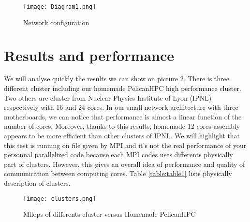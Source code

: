 \documentclass[11pt,a4paper]{article}
\begin{document}
\begin{figure}[!htb]
\centering
\texttt{[image: Diagram1.png]}
\caption{Network configuration}
\label{fig:Figure2}
\end{figure}

\section{Results and performance}
\noindent
We will analyse quickly the results we can show on picture \ref{fig:Figure3}. There is three different cluster including our homemade PelicanHPC high performance cluster. Two others are cluster from Nuclear Physics Institute of Lyon (IPNL) respectively with 16 and 24 cores. In our small network architecture with three motherboards, we can notice that performance is almost a linear function of the number of cores. Moreover, thanks to this results, homemade 12 cores assembly appears to be more efficient than other clusters of IPNL. We will highlight that this test is running on  file given by MPI and it's not the real performance of your personnal parallelized code because each MPI codes uses differents physically part of clusters. However, this gives an overall idea of performance and quality of communication between computing cores. Table \ref{table:table1} lists physically description of clusters.

\begin{figure}[!htb]
\centering
\texttt{[image: clusters.png]}
\caption{Mflops of differents cluster versus Homemade PelicanHPC}
\label{fig:Figure3}
\end{figure}
\end{document}
